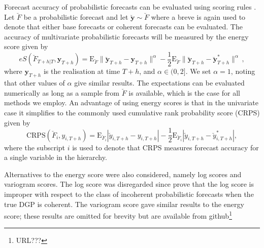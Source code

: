 \documentclass[graybox]{svmult}
\def\E{\text{E}}
\begin{document}
Forecast accuracy of probabilistic forecasts can be evaluated using scoring rules \citep{Gneiting2014}. Let $\breve{F}$ be a probabilistic forecast and let $\breve{\bm{y}}\sim \breve{F}$ where a breve is again used to denote that either base forecasts or coherent forecasts can be evaluated. The accuracy of multivariate probabilistic forecasts will be measured by the energy score given by
\begin{equation*}
	eS(\breve{F}_{T+h|T},\bm{y}_{T+h}) =
	\E_{\breve{F}}\|\breve{\bm{y}}_{T+h}-\bm{y}_{T+h}\|^\alpha
	-\frac{1}{2}\E_{\breve{F}}\|\breve{\bm{y}}_{T+h}-\breve{\bm{y}}^*_{T+h}\|^\alpha\,,
\end{equation*} where $\bm{y}_{T+h}$ is the realisation at time $T+h$, and $\alpha\in (0,2]$. We set $\alpha=1$, noting that other values of $\alpha$ give similar results. The expectations can be evaluated numerically as long as a sample from $\breve{F}$ is available, which is the case for all methods we employ. An advantage of using energy scores is that in the univariate case it simplifies to the commonly used cumulative rank probability score (CRPS) given by
\begin{equation*}
	\text{CRPS}(\breve{F}_i,y_{i,T+h}) = \E_{\breve{F}_i}|\breve{y}_{i,T+h}-y_{i,T+h}| - \frac{1}{2}\E_{\breve{F}_i}|\breve{y}_{i,T+h}-\breve{y}^*_{i,T+h}|,
\end{equation*}
where the subscript $i$ is used to denote that CRPS measures forecast accuracy for a single variable in the hierarchy.

Alternatives to the energy score were also considered, namely log scores and variogram scores. The log score was disregarded since \citet{GamEtAl2018} prove that the log score is improper with respect to the class of incoherent probabilistic forecasts when the true DGP is coherent. The variogram score gave similar results to the energy score;  these results are omitted for brevity but are available from github\footnote{URL???}
\end{document}
